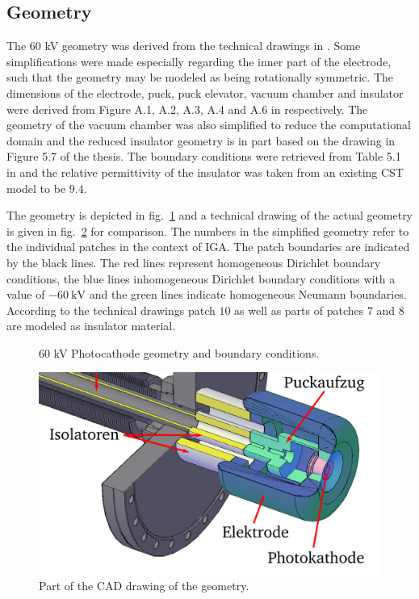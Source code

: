 \subsection{Geometry}
The $60$ kV geometry was derived from the technical drawings in \cite{espig}. Some simplifications were made especially regarding the inner part of the electrode, such that the geometry may be modeled as being rotationally symmetric. The dimensions of the electrode, puck, puck elevator, vacuum chamber and insulator were derived from Figure A.1, A.2, A.3, A.4 and A.6 in \cite{espig} respectively. The geometry of the vacuum chamber was also simplified to reduce the computational domain and the reduced insulator geometry is in part based on the drawing in Figure 5.7 of the thesis.
The boundary conditions were retrieved from Table 5.1 in \cite{espig} and the relative permittivity of the insulator was taken from an existing CST model to be $9.4$.

The geometry is depicted in fig.~\ref{fig:geometry} and a technical drawing of the actual geometry is given in fig.~\ref{fig:cad_geometry} for comparison. The numbers in the simplified geometry refer to the individual patches in the context of IGA. The patch boundaries are indicated by the black lines. The red lines represent homogeneous Dirichlet boundary conditions, the blue lines inhomogeneous Dirichlet boundary conditions with a value of $-60\ \mathrm{kV}$ and the green lines indicate homogeneous Neumann boundaries.
According to the technical drawings patch $10$ as well as parts of patches $7$ and $8$ are modeled as insulator material.

\begin{center}
\begin{figure}[H]
  
  \caption{60 kV Photocathode geometry and boundary conditions.}
  \label{fig:geometry}
\end{figure}
\end{center}

\begin{center}
\begin{figure}[H]
  \includegraphics[width=\textwidth]{figures/60kV/geometry}
  \caption{Part of the CAD drawing of the geometry.}
  \label{fig:cad_geometry}
\end{figure}
\end{center}


